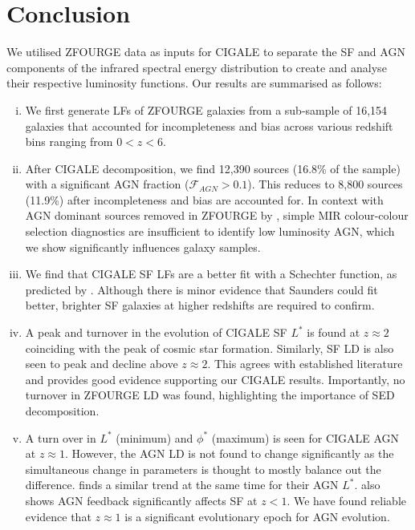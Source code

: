 \section{Conclusion}

We utilised ZFOURGE data as inputs for CIGALE to separate the SF and AGN components of the infrared spectral energy distribution to create and analyse their respective luminosity functions. Our results are summarised as follows:

\begin{enumerate}[(i)]
    \item We first generate LFs of ZFOURGE galaxies from a sub-sample of 16,154 galaxies that accounted for incompleteness and bias across various redshift bins ranging from $0<z<6$.
    
    \item After CIGALE decomposition, we find 12,390 sources (16.8\% of the sample) with a significant AGN fraction ($\mathcal{F}_{AGN} > 0.1$). This reduces to 8,800 sources (11.9\%) after incompleteness and bias are accounted for. In context with AGN dominant sources removed in ZFOURGE by \cite{cowley_zfourge_2016}, simple MIR colour-colour selection diagnostics are insufficient to identify low luminosity AGN, which we show significantly influences galaxy samples.
    
    \item We find that CIGALE SF LFs are a better fit with a Schechter function, as predicted by \cite{wu_mid-infrared_2011, fu_decomposing_2010}. Although there is minor evidence that Saunders could fit better, brighter SF galaxies at higher redshifts are required to confirm. 

    \item A peak and turnover in the evolution of CIGALE SF $L^{*}$ is found at $z \approx 2$ coinciding with the peak of cosmic star formation. Similarly, SF LD is also seen to peak and decline above $z\approx2$. This agrees with established literature and provides good evidence supporting our CIGALE results. Importantly, no turnover in ZFOURGE LD was found, highlighting the importance of SED decomposition.
    
    \item A turn over in $L^{*}$ (minimum) and $\phi^{*}$ (maximum) is seen for CIGALE AGN at $z \approx 1$. However, the AGN LD is not found to change significantly as the simultaneous change in parameters is thought to mostly balance out the difference. \cite{delvecchio_tracing_2014} finds a similar trend at the same time for their AGN $L^{*}$. \cite{katsianis_evolution_2017} also shows AGN feedback significantly affects SF at $z<1$. We have found reliable evidence that $z\approx1$ is a significant evolutionary epoch for AGN evolution. 
    

\end{enumerate}

